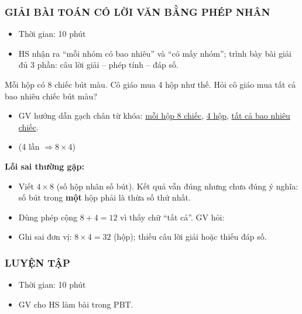 \documentclass[../main.tex]{subfiles}
\begin{document}
\subsubsection{GIẢI BÀI TOÁN CÓ LỜI VĂN BẰNG PHÉP NHÂN}
\begin{hd}
    \begin{itemize}
        \item Thời gian: 10 phút
        \item HS nhận ra “mỗi nhóm có bao nhiêu” và “có mấy nhóm”; trình bày bài giải đủ 3 phần: câu lời giải -- phép tính -- đáp số.
    \end{itemize}
\end{hd}
\begin{vd}
    Mỗi hộp có 8 chiếc bút màu. Cô giáo mua 4 hộp như thế. Hỏi cô giáo mua tất cả bao nhiêu chiếc bút màu?
\end{vd}
\begin{itemize}
    \item GV hướng dẫn gạch chân từ khóa: \underline{mỗi hộp 8 chiếc}, \underline{4 hộp}, \underline{tất cả bao nhiêu chiếc}.
    \item {} \hfill (4 lần $\Rightarrow 8 \times 4$)
\end{itemize}
\begin{luuy}
    \textbf{Lỗi sai thường gặp:}
    \begin{itemize}
        \item Viết $4 \times 8$ (số hộp nhân số bút). Kết quả vẫn đúng nhưng chưa đúng ý nghĩa: số bút trong \textbf{một} hộp phải là thừa số thứ nhất.
        \item Dùng phép cộng $8 + 4 = 12$ vì thấy chữ “tất cả”. GV hỏi: 
        \item Ghi sai đơn vị: $8 \times 4 = 32$ (hộp); thiếu câu lời giải hoặc thiếu đáp số.
    \end{itemize}
\end{luuy}
\subsubsection{LUYỆN TẬP}
\begin{hd}
    \begin{itemize}
        \item Thời gian: 10 phút
        \item GV cho HS làm bài trong PBT.
    \end{itemize}
\end{hd}
\end{document}

